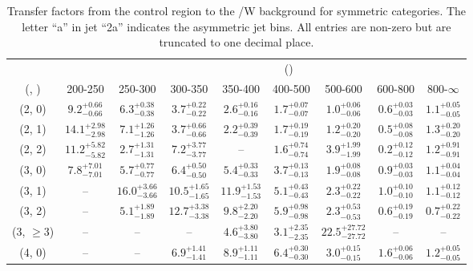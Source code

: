 \begin{table}[h!]
\tiny
\centering
\caption{Transfer factors from the \mmj control region to the \ttbar/W background for symmetric categories. The letter ``a'' in jet \eg ``2a''  indicates the asymmetric jet bins. All entries are non-zero but are truncated to one decimal place.\label{tab:tf_mumu_ttw_sym}}
\begin{tabular}
{ccccccccc}
	\hline\hline
&	& \multicolumn{8}{c}{\scalht (\gev)} \\ 
	 (\njet,  \nb) & 200-250 & 250-300 & 300-350 & 350-400 & 400-500 & 500-600 & 600-800 & 800-$\infty$ \\ [0.8ex] 
\hline
	(2, 0) & $9.2^{+ 0.66 }_{- 0.66 }$ & $6.3^{+ 0.38 }_{- 0.38 }$ & $3.7^{+ 0.22 }_{- 0.22 }$ & $2.6^{+ 0.16 }_{- 0.16 }$ & $1.7^{+ 0.07 }_{- 0.07 }$ & $1.0^{+ 0.06 }_{- 0.06 }$ & $0.6^{+ 0.03 }_{- 0.03 }$ & $1.1^{+ 0.05 }_{- 0.05 }$ \\[0.5ex] 
	(2, 1) & $14.1^{+ 2.98 }_{- 2.98 }$ & $7.1^{+ 1.26 }_{- 1.26 }$ & $3.7^{+ 0.66 }_{- 0.66 }$ & $2.2^{+ 0.39 }_{- 0.39 }$ & $1.7^{+ 0.19 }_{- 0.19 }$ & $1.2^{+ 0.20 }_{- 0.20 }$ & $0.5^{+ 0.08 }_{- 0.08 }$ & $1.3^{+ 0.20 }_{- 0.20 }$ \\[0.5ex] 
	(2, 2) & $11.2^{+ 5.82 }_{- 5.82 }$ & $2.7^{+ 1.31 }_{- 1.31 }$ & $7.2^{+ 3.77 }_{- 3.77 }$ & -- & $1.6^{+ 0.74 }_{- 0.74 }$ & $3.9^{+ 1.99 }_{- 1.99 }$ & $0.2^{+ 0.12 }_{- 0.12 }$ & $1.2^{+ 0.91 }_{- 0.91 }$ \\[0.5ex] 
	(3, 0) & $7.8^{+ 7.01 }_{- 7.01 }$ & $5.7^{+ 0.77 }_{- 0.77 }$ & $6.4^{+ 0.50 }_{- 0.50 }$ & $5.4^{+ 0.33 }_{- 0.33 }$ & $3.7^{+ 0.13 }_{- 0.13 }$ & $1.9^{+ 0.08 }_{- 0.08 }$ & $0.9^{+ 0.03 }_{- 0.03 }$ & $1.1^{+ 0.04 }_{- 0.04 }$ \\[0.5ex] 
	(3, 1) & -- & $16.0^{+ 3.66 }_{- 3.66 }$ & $10.5^{+ 1.65 }_{- 1.65 }$ & $11.9^{+ 1.53 }_{- 1.53 }$ & $5.1^{+ 0.43 }_{- 0.43 }$ & $2.3^{+ 0.22 }_{- 0.22 }$ & $1.0^{+ 0.10 }_{- 0.10 }$ & $1.1^{+ 0.12 }_{- 0.12 }$ \\[0.5ex] 
	(3, 2) & -- & $5.1^{+ 1.89 }_{- 1.89 }$ & $12.7^{+ 3.38 }_{- 3.38 }$ & $9.8^{+ 2.20 }_{- 2.20 }$ & $5.9^{+ 0.98 }_{- 0.98 }$ & $2.3^{+ 0.53 }_{- 0.53 }$ & $0.6^{+ 0.19 }_{- 0.19 }$ & $0.7^{+ 0.22 }_{- 0.22 }$ \\[0.5ex] 
	(3, $\ge3$) & -- & -- & -- & $4.6^{+ 3.80 }_{- 3.80 }$ & $3.1^{+ 2.35 }_{- 2.35 }$ & $22.5^{+ 27.72 }_{- 27.72 }$ & -- & -- \\[0.5ex] 
	(4, 0) & -- & -- & $6.9^{+ 1.41 }_{- 1.41 }$ & $8.9^{+ 1.11 }_{- 1.11 }$ & $6.4^{+ 0.30 }_{- 0.30 }$ & $3.0^{+ 0.15 }_{- 0.15 }$ & $1.6^{+ 0.06 }_{- 0.06 }$ & $1.2^{+ 0.05 }_{- 0.05 }$ \\[0.5ex] 

\end{tabular}
\end{table}
